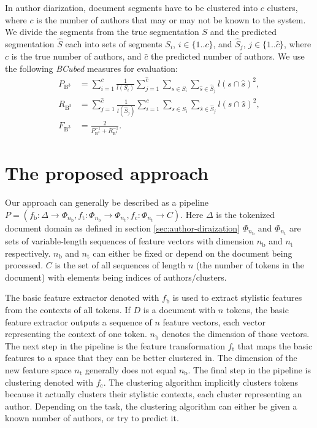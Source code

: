 \documentclass[10pt, a4paper]{article}
\begin{document}
In author diarization, document segments have to be clustered into $c$ clusters, where $c$ is the number of authors that may or may not be known to the system. We divide the segments from the true segmentation $S$ and the predicted segmentation $\hat{S}$ each into sets of segments $S_i$, $i\in\{1..c\}$, and $\hat{S}_j$, $j\in\{1..\hat{c}\}$, where $c$ is the true number of authors, and $\hat{c}$ the predicted number of authors. We use the following \emph{BCubed} measures for evaluation:
\begin{align}
P_{\mathrm{B}^3} &= \sum_{i=1}^c \frac{1}{l(S_i)}\sum_{j=1}^{\hat{c}}
	\sum_{s\in S_i}	\sum_{\hat{s}\in\hat{S}_j} l(s\cap \hat{s})^2, \\
R_{\mathrm{B}^3} &= \sum_{j=1}^{\hat{c}} \frac{1}{l(\hat{S}_j)}\sum_{i=1}^{c}
	\sum_{s\in S_i}	\sum_{\hat{s}\in\hat{S}_j} l(s\cap \hat{s})^2, \\
F_{\mathrm{B}^3} &= \frac{2}{P_{\mathrm{B}^3}^{-1}+R_{\mathrm{B}^3}^{-1}}.
\end{align}


\section{The proposed approach} \label{sec:the-proposed-approach}

Our approach can generally be described as a pipeline $P = (f_\mathrm{b}:\Delta\rightarrow \Phi_{n_\mathrm{b}}, f_\mathrm{t}:\Phi_{n_\mathrm{b}}\rightarrow \Phi_{n_\mathrm{t}}, f_\mathrm{c}:\Phi_{n_\mathrm{t}}\rightarrow C)$. Here $\Delta$ is the tokenized document domain as defined in section \ref{sec:author-diraization} $\Phi_{n_\mathrm{b}}$ and $\Phi_{n_\mathrm{t}}$ are sets of variable-length sequences of feature vectors with dimension $n_\mathrm{b}$ and $n_\mathrm{t}$ respectively. $n_\mathrm{b}$ and $n_\mathrm{t}$ can either be fixed or depend on the document being processed. $C$ is the set of all sequences of length $n$ (the number of tokens in the document) with elements being indices of authors/clusters.

The basic feature extractor denoted with $f_\mathrm{b}$ is used to extract stylistic features from the contexts of all tokens. If $D$ is a document with $n$ tokens, the basic feature extractor outputs a sequence of $n$ feature vectors, each vector representing the context of one token. $n_\mathrm{b}$ denotes the dimension of those vectors. The next step in the pipeline is the feature transformation $f_\mathrm{t}$ that maps the basic features to a space that they can be better clustered in. The dimension of the new feature space $n_\mathrm{t}$ generally does not equal $n_\mathrm{b}$. The final step in the pipeline is clustering denoted with $f_\mathrm{c}$. The clustering algorithm implicitly clusters tokens because it actually clusters their stylistic contexts, each cluster representing an author. Depending on the task, the clustering algorithm can either be given a known number of authors, or try to predict it.
\end{document}
